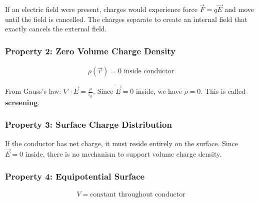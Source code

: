 \documentclass{article}
\begin{document}
If an electric field were present, charges would experience force $\vec{F} = q\vec{E}$ and move until the field is cancelled. The charges separate to create an internal field that exactly cancels the external field.

\begin{center}
\end{center}

\subsubsection{Property 2: Zero Volume Charge Density}
\begin{align*}
    \rho(\vec{r}) = 0 \text{ inside conductor}
\end{align*}

From Gauss's law: $\nabla \cdot \vec{E} = \frac{\rho}{\epsilon_0}$. Since $\vec{E} = 0$ inside, we have $\rho = 0$. This is called \textbf{screening}.

\subsubsection{Property 3: Surface Charge Distribution}
If the conductor has net charge, it must reside entirely on the surface. Since $\vec{E} = 0$ inside, there is no mechanism to support volume charge density.

\subsubsection{Property 4: Equipotential Surface}
\begin{align*}
    V = \text{constant throughout conductor}
\end{align*}
\end{document}
